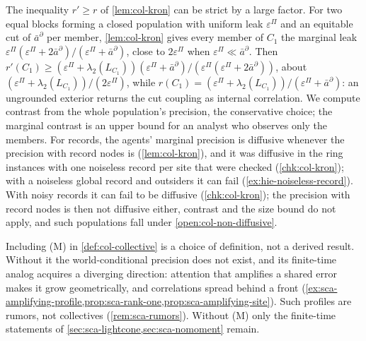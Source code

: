 \begin{remark}\label{rem:col-which-contrast}
The inequality $r'\ge r$ of \cref{lem:col-kron} can be strict by a large factor. For two equal blocks forming a closed population with uniform leak $\varepsilon^\Pi$ and an equitable cut of $\bar a^\partial$ per member, \cref{lem:col-kron} gives every member of $C_1$ the marginal leak $\varepsilon^\Pi(\varepsilon^\Pi+2\bar a^\partial)/(\varepsilon^\Pi+\bar a^\partial)$, close to $2\varepsilon^\Pi$ when $\varepsilon^\Pi\ll\bar a^\partial$. Then $r'(C_1)\ge(\varepsilon^\Pi+\lambda_2(L_{C_1}))(\varepsilon^\Pi+\bar a^\partial)/(\varepsilon^\Pi(\varepsilon^\Pi+2\bar a^\partial))$, about $(\varepsilon^\Pi+\lambda_2(L_{C_1}))/(2\varepsilon^\Pi)$, while $r(C_1)=(\varepsilon^\Pi+\lambda_2(L_{C_1}))/(\varepsilon^\Pi+\bar a^\partial)$: an ungrounded exterior returns the cut coupling as internal correlation. We compute contrast from the whole population's precision, the conservative choice; the marginal contrast is an upper bound for an analyst who observes only the members. For records, the agents' marginal precision is diffusive whenever the precision with record nodes is (\cref{lem:col-kron}), and it was diffusive in the ring instances with one noiseless record per site that were checked (\cref{chk:col-kron}); with a noiseless global record and outsiders it can fail (\cref{ex:hie-noiseless-record}). With noisy records it can fail to be diffusive (\cref{chk:col-kron}); the precision with record nodes is then not diffusive either, contrast and the size bound do not apply, and such populations fall under \cref{open:col-non-diffusive}.
\end{remark}

\begin{remark}\label{rem:col-moment}
Including (M) in \cref{def:col-collective} is a choice of definition, not a derived result. Without it the world-conditional precision does not exist, and its finite-time analog acquires a diverging direction: attention that amplifies a shared error makes it grow geometrically, and correlations spread behind a front (\cref{ex:sca-amplifying-profile,prop:sca-rank-one,prop:sca-amplifying-site}). Such profiles are rumors, not collectives (\cref{rem:sca-rumors}). Without (M) only the finite-time statements of \cref{sec:sca-lightcone,sec:sca-nomoment} remain.
\end{remark}

